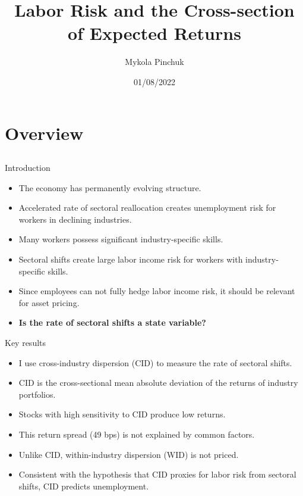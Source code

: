 \documentclass{beamer}
\title{Labor Risk and the Cross-section of Expected Returns \\ }
\author{Mykola Pinchuk}
\date{01/08/2022}
\begin{document}
\begin{frame}
  \titlepage
\end{frame}

\section{Overview}
\subsection{}

\begin{frame}{Introduction}
\begin{itemize}
    \item {The economy has permanently evolving structure.}
    \item {Accelerated rate of sectoral reallocation creates unemployment risk for workers in declining industries.}
    \item {Many workers possess significant industry-specific skills.}
    \item {Sectoral shifts create large labor income risk for workers with industry-specific skills.}
    \item {Since employees can not fully hedge labor income risk, it should be relevant for asset pricing.}
    \item {\textbf{Is the rate of sectoral shifts a state variable?}}
\end{itemize}

\end{frame}


\begin{frame}{Key results}
\begin{itemize}
    \item {I use cross-industry dispersion (CID) to measure the rate of sectoral shifts.}
    \item {CID is the cross-sectional mean absolute deviation of the returns of industry portfolios.}
    \item {Stocks with high sensitivity to CID produce low returns.}
    \item {This return spread (49 bps) is not explained by common factors.}
    \item {Unlike CID, within-industry dispersion (WID) is not priced.}
    \item {Consistent with the hypothesis that CID proxies for labor risk from sectoral shifts, CID predicts unemployment.}
\end{itemize}
\end{frame}
\end{document}
